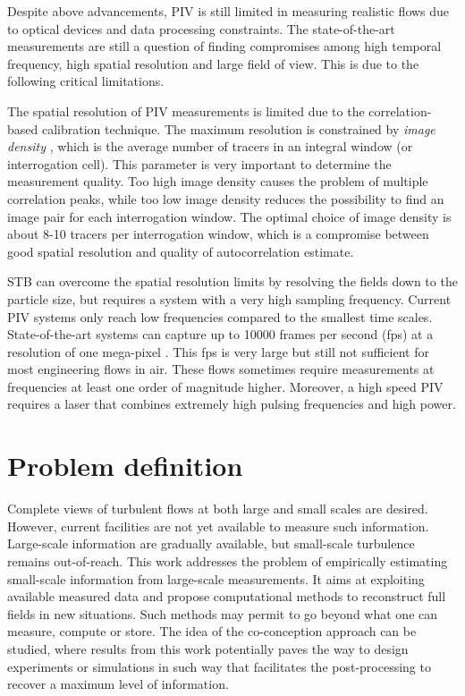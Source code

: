 Despite above advancements, PIV is still limited in measuring realistic flows due to optical devices and data processing constraints. The state-of-the-art measurements are still a question of finding compromises among high temporal frequency, high spatial resolution and large field of view. This is due to the following critical limitations. 

The spatial resolution of PIV measurements is limited due to the correlation-based calibration technique. The maximum resolution is constrained by \textit{image density} \citep{keane1992theory}, which is the average number of tracers in an integral window (or interrogation cell). This parameter is very important to determine the measurement quality. Too high image density causes the problem of multiple correlation peaks, while too low image density reduces the possibility to find an image pair for each interrogation window. The optimal choice of image density is about 8-10 tracers per interrogation window, which is a compromise between good spatial resolution and quality of autocorrelation estimate. 

STB can overcome the spatial resolution limits by resolving the fields down to the particle size, but requires a system with a very high sampling frequency. Current PIV systems only reach low frequencies compared to the smallest time scales. State-of-the-art systems can capture up to 10000 frames per second (fps) at a resolution of one mega-pixel \citep{willert2015high}. This fps is very large but still not sufficient for most engineering flows in air. These flows sometimes require measurements at frequencies at least one order of magnitude higher. Moreover, a high speed PIV requires a laser that combines extremely high pulsing frequencies and high power.

\section{Problem definition}
Complete views of turbulent flows at both large and small scales are desired. However, current facilities are not yet available to measure such information. Large-scale  information are gradually available, but small-scale turbulence remains out-of-reach. This work addresses the problem of empirically estimating small-scale information from large-scale measurements. It aims at exploiting available measured data and propose computational methods to reconstruct full fields in new situations. Such methods may permit to go beyond what one can measure, compute or store. The idea of the co-conception approach can be studied, where results from this work potentially paves the way to design experiments or simulations in such way that facilitates the post-processing to recover a maximum level of information.

